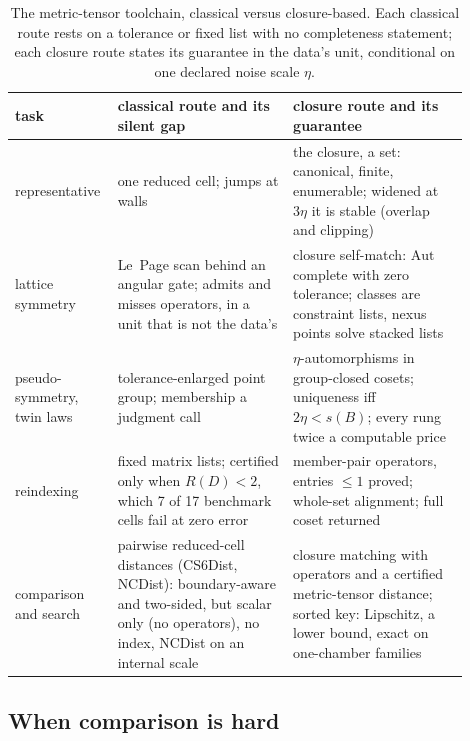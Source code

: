 \documentclass[preprint,pdf]{iucr}          %
\begin{document}
\begin{table}
\caption{The metric-tensor toolchain, classical versus closure-based. Each classical route rests on a tolerance or fixed list with no completeness statement; each closure route states its guarantee in the data's unit, conditional on one declared noise scale $\eta$.}
\label{tab:toolchain}
\begin{footnotesize}\begin{tabular}{p{0.16\linewidth}p{0.37\linewidth}p{0.37\linewidth}}
task & classical route and its silent gap & closure route and its guarantee \\
\hline
representative & one reduced cell; jumps at walls & the closure, a set: canonical, finite, enumerable; widened at $3\eta$ it is stable (overlap and clipping) \\
lattice symmetry & Le~Page scan behind an angular gate; admits and misses operators, in a unit that is not the data's & closure self-match: $\mathrm{Aut}$ complete with zero tolerance; classes are constraint lists, nexus points solve stacked lists \\
pseudo-symmetry, twin laws & tolerance-enlarged point group; membership a judgment call & $\eta$-automorphisms in group-closed cosets; uniqueness iff $2\eta<s(B)$; every rung twice a computable price \\
reindexing & fixed matrix lists; certified only when $R(D)<2$, which 7 of 17 benchmark cells fail at zero error & member-pair operators, entries $\le1$ proved; whole-set alignment; full coset returned \\
comparison and search & pairwise reduced-cell distances (CS6Dist, NCDist): boundary-aware and two-sided, but scalar only (no operators), no index, NCDist on an internal scale & closure matching with operators and a certified metric-tensor distance; sorted key: Lipschitz, a lower bound, exact on one-chamber families \\
\end{tabular}\end{footnotesize}
\end{table}

\subsection{When comparison is hard}
\label{sec:hard}
\end{document}
